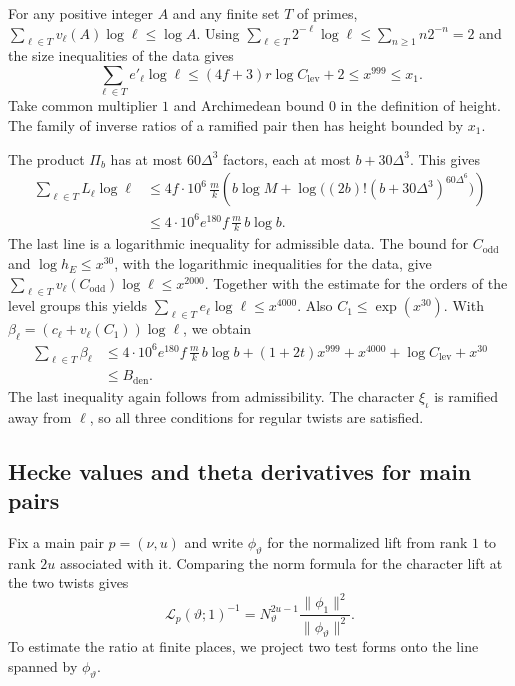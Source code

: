 For any positive integer \(A\) and any finite set \(T\) of primes,
\(\sum_{\ell\in T}v_\ell(A)\log\ell\le\log A\).
Using \(\sum_{\ell\in T}2^{-\ell}\log\ell\le\sum_{n\ge1}n2^{-n}=2\)
and the size inequalities of the data gives
\[
 \sum_{\ell\in T} e'_\ell\log\ell
 \le (4f+3)r\log C_{\mathrm{lev}}+2\le x^{999}\le x_1 .
\]
Take common multiplier \(1\) and Archimedean bound \(0\) in the
definition of height. The family of inverse ratios of a ramified
pair then has height bounded by \(x_1\).

The product \(\Pi_b\) has at most \(60\Delta^3\) factors, each
at most \(b+30\Delta^3\). This gives
\[
 \begin{split}
 \sum_{\ell\in T} L_\ell\log\ell
 &\le 4f\cdot10^6\,\frac{m}{k}
      \left(b\log M+\log\big((2b)!(b+30\Delta^3)^{60\Delta^6}\big)\right)\\
 &\le 4\cdot10^6 e^{180} f\,\frac{m}{k}\,b\log b .
 \end{split}
\]
The last line is a logarithmic inequality for admissible data.
The bound for \(C_{\mathrm{odd}}\) and \(\log h_E\le x^{30}\),
with the logarithmic inequalities for the data, give
\(\sum_{\ell\in T}v_\ell(C_{\mathrm{odd}})\log\ell\le x^{2000}\).
Together with the estimate for the orders of the level groups
this yields \(\sum_{\ell\in T}e_\ell\log\ell\le x^{4000}\).
Also \(C_1\le\exp(x^{30})\). With
\(\beta_\ell=(c_\ell+v_\ell(C_1))\log\ell\), we obtain
\[
 \begin{split}
 \sum_{\ell\in T}\beta_\ell
 &\le 4\cdot10^6 e^{180} f\,\frac{m}{k}\,b\log b
          +(1+2t)x^{999}+x^{4000}+\log C_{\mathrm{lev}}+x^{30}\\
 &\le B_{\mathrm{den}} .
 \end{split}
\]
The last inequality again follows from admissibility. The character
\(\xi_\iota\) is ramified away from \(\ell\), so all three conditions
for regular twists are satisfied.

\subsection{Hecke values and theta derivatives for main pairs}

Fix a main pair \(p=(\nu,u)\) and write \(\phi_\vartheta\) for the normalized
lift from rank \(1\) to rank \(2u\) associated with it. Comparing the norm
formula for the character lift at the two twists gives
\begin{equation}
 \mathcal L_p(\vartheta;1)^{-1}
   =N_\vartheta^{2u-1}\frac{\|\phi_1\|^2}{\|\phi_\vartheta\|^2}.
 \label{eq:main-pair-norm}
\end{equation}
To estimate the ratio at finite places, we project two test forms onto the
line spanned by \(\phi_\vartheta\).

